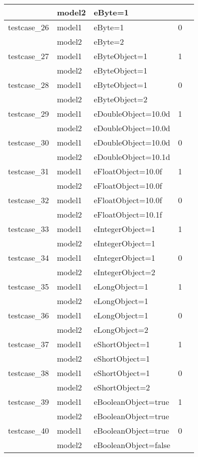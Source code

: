 \documentclass[a4paper]{article}
\begin{document}
\begin{longtable}{|l|l|l|l|l|}
\hline
             & model2 & eByte=1 & &\\
\hline
\hline
testcase\_26 & model1 & eByte=1 & 0 &\\
\hline
             & model2 & eByte=2 & &\\
\hline
\hline
testcase\_27 & model1 & eByteObject=1 & 1 &\\
\hline
             & model2 & eByteObject=1 & &\\
\hline
\hline
testcase\_28 & model1 & eByteObject=1 & 0 &\\
\hline
             & model2 & eByteObject=2 & &\\
\hline
\hline
testcase\_29 & model1 & eDoubleObject=10.0d & 1 &\\
\hline
             & model2 & eDoubleObject=10.0d & &\\
\hline
\hline
testcase\_30 & model1 & eDoubleObject=10.0d & 0 &\\
\hline
             & model2 & eDoubleObject=10.1d & &\\
\hline
\hline
testcase\_31 & model1 & eFloatObject=10.0f & 1 &\\
\hline
             & model2 & eFloatObject=10.0f & &\\
\hline
\hline
testcase\_32 & model1 & eFloatObject=10.0f & 0 &\\
\hline
             & model2 & eFloatObject=10.1f & &\\
\hline
\hline
testcase\_33 & model1 & eIntegerObject=1 & 1 &\\
\hline
             & model2 & eIntegerObject=1 & &\\
\hline
\hline
testcase\_34 & model1 & eIntegerObject=1 & 0 &\\
\hline
             & model2 & eIntegerObject=2 & &\\
\hline
\hline
testcase\_35 & model1 & eLongObject=1 & 1 &\\
\hline
             & model2 & eLongObject=1 & &\\
\hline
\hline
testcase\_36 & model1 & eLongObject=1 & 0 &\\
\hline
             & model2 & eLongObject=2 & &\\
\hline
\hline
testcase\_37 & model1 & eShortObject=1 & 1 \\
\hline
             & model2 & eShortObject=1 & &\\
\hline
\hline
testcase\_38 & model1 & eShortObject=1 & 0 &\\
\hline
             & model2 & eShortObject=2 & &\\
\hline
\hline
testcase\_39 & model1 & eBooleanObject=true & 1 &\\
\hline
             & model2 & eBooleanObject=true & &\\
\hline
\hline
testcase\_40 & model1 & eBooleanObject=true & 0 &\\
\hline
             & model2 & eBooleanObject=false & &\\
\hline

\end{longtable}
\end{document}
